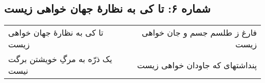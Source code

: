 \begin{center}
\section*{شماره ۶: تا کی به نظارۀ جهان خواهی زیست}
\label{sec:006}
\begin{longtable}{l p{0.5cm} r}
تا کی به نظارهٔ جهان خواهی زیست
&&
فارغ ز طلسم جسم و جان خواهی زیست
\\
یک ذرّه به مرگِ خویشتن برگت نیست
&&
پنداشتهای که جاودان خواهی زیست
\\
\end{longtable}
\end{center}
